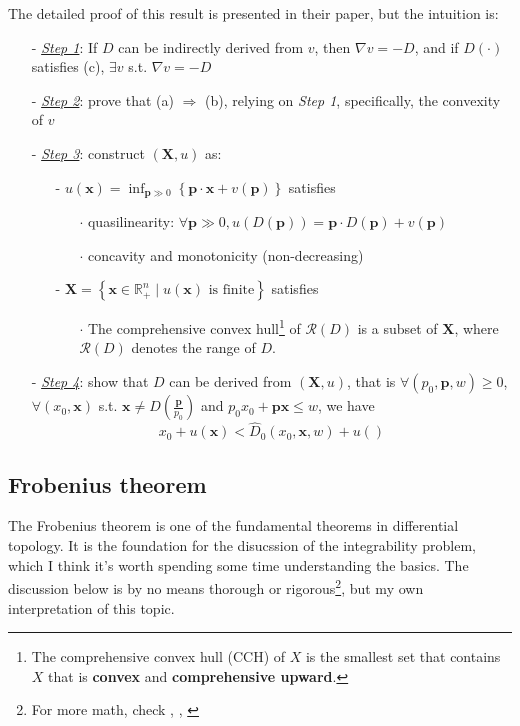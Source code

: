 The detailed proof of this result is presented in their paper, but the intuition is:
\begin{enumerate}
    \item[-] \underline{\textit{Step 1}}: If $D$ can be indirectly derived from $v$, then $\nabla v=-D$, and if $D(\cdot)$ satisfies (c), $\exists v$ s.t. $\nabla v=-D$
    \item[-] \underline{\textit{Step 2}}: prove that (a) $\Rightarrow$ (b), relying on \textit{Step 1}, specifically, the convexity of $v$
    \item[-] \underline{\textit{Step 3}}: construct $(\mathbf{X},u)$ as:
    \begin{enumerate}
        \item[-] $u(\mathbf{x})=\inf_{\mathbf{p}\gg 0}\left\{\mathbf{p}\cdot\mathbf{x}+v(\mathbf{p})\right\}$ satisfies
        \begin{enumerate}
            \item[$\cdot$] quasilinearity: $\forall \mathbf{p}\gg 0, u(D(\mathbf{p}))=\mathbf{p}\cdot D(\mathbf{p})+v(\mathbf{p})$
            \item[$\cdot$] concavity and monotonicity (non-decreasing) 
        \end{enumerate}
        \item[-] $\mathbf{X}=\left\{ \mathbf{x} \in \mathbb{R}^n_+\mid u(\mathbf{x}) \text{ is finite} \right\}$ satisfies
        \begin{enumerate}
            \item[$\cdot$] The comprehensive convex hull\footnote{The comprehensive convex hull (CCH) of $X$ is the smallest set that contains $X$ that is \textbf{convex} and \textbf{comprehensive upward}.} of $\mathcal{R}(D)$ is a subset of $\mathbf{X}$, where $\mathcal{R}(D)$ denotes the range of $D$.
        \end{enumerate}
    \end{enumerate}
    \item[-] \underline{\textit{Step 4}}: show that $D$ can be derived from $(\mathbf{X},u)$, that is $\forall (p_0,\mathbf{p},w)\geq 0$, $\forall (x_0,\mathbf{x})$ s.t. $\mathbf{x}\neq D\left(\frac{\mathbf{p}}{p_0}\right)$ and $p_0x_0 +\mathbf{p}\mathbf{x}\leq w$, we have $$ x_0 + u(\mathbf{x}) < \hat{D}_0(x_0,\mathbf{x},w)+u\left( \right) $$
\end{enumerate}

\subsection{Frobenius theorem}\label{sssec:frobenius_theorem}
The Frobenius theorem is one of the fundamental theorems in differential topology. It is the foundation for the disucssion of the integrability problem, which I think it's worth spending some time understanding the basics. The discussion below is by no means thorough or rigorous\footnote{For more math, check \cite{sternberg1999lectures}, \cite{warner1983foundations}, \cite{mccleary2013geometry}}, but my own interpretation of this topic.

